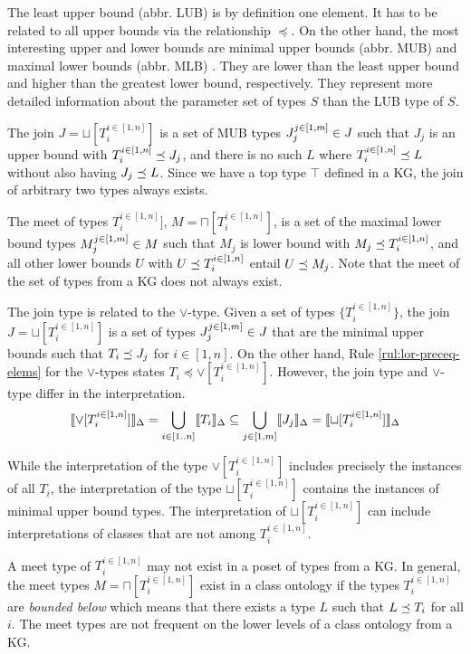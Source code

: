 \documentclass[runningheads]{llncs}
\newcommand{\llb}{\llbracket}
\newcommand{\rrb}{\rrbracket}
\begin{document}
The least upper bound (abbr. LUB) is by definition one element. It has
to be related to all upper bounds via the relationship $\preceq$.  On
the other hand, the most interesting upper and lower bounds are
minimal upper bounds (abbr. MUB) and maximal lower bounds (abbr. MLB)
\cite{Knudstorp2024}. They are lower than the least upper bound and
higher than the greatest lower bound, respectively. They represent
more detailed information about the parameter set of types $S$ than
the LUB type of $S$.

The join $J=\sqcup[T_i^{i\in[1,n]}]$ is a set of MUB types
$J_j^{j\in[1,m]}\in\/J$ such that $J_j$ is an upper bound with
$T_i^{i\in[1,n]}\preceq\/J_j$, and there is no such $L$ where
$T_i^{i\in[1,n]}\preceq\/L$ without also having $J_j\preceq\/L$. Since
we have a top type $\top$ defined in a KG, the join of arbitrary two
types always exists.

The meet of types $T_i^{i\in[1,n]}]$, $M=\sqcap[T_i^{i\in[1,n]}]$, is
a set of the maximal lower bound types $M_j^{j\in[1,m]}\in\/M$ such
that $M_j$ is lower bound with $M_j\preceq\/T_i^{i\in[1,n]}$, and all
other lower bounds $U$ with $U\preceq\/T_i^{i\in[1,n]}$ entail
$U\preceq\/M_j$. Note that the meet of the set of types from a KG does
not always exist.

The join type is related to the $\lor$-type. Given a set of types
$\{T_i^{i\in[1,n]}\}$, the join $J=\sqcup[T_i^{i\in[1,n]}]$ is a set
of types $J_j^{j\in[1,m]}\in\/J$ that are the minimal upper bounds
such that $T_i\preceq\/J_j$ for $i\in[1,n]$. On the other hand,
Rule \ref{rul:lor-preceq-elems} for the $\lor$-types states
$T_i\preceq\lor[T_i^{i\in[1,n]}]$. However, the join type and
$\lor$-type differ in the interpretation.
$$\llb\lor[T_i^{i\in[1,n]}]\rrb_\D=\bigcup_{i\in[1..n]}\llb\/T_i\rrb_\D\subseteq\bigcup_{j\in[1,m]}\llb\/J_j\rrb_\D=\llb\sqcup[T_i^{i\in[1,n]}]\rrb_\D$$

While the interpretation of the type $\lor[T_i^{i\in[1,n]}]$ includes
precisely the instances of all $T_i$, the interpretation of the type
$\sqcup[T_i^{i\in[1,n]}]$ contains the instances of minimal upper bound
types. The interpretation of $\sqcup[T_i^{i\in[1,n]}]$ can include
interpretations of classes that are not among $T_i^{i\in[1,n]}$.

A meet type of $T_i^{i\in[1,n]}$ may not exist in a poset of types
from a KG. In general, the meet types $M=\sqcap[T_i^{i\in[1,n]}]$
exist in a class ontology if the types $T_i^{i\in[1,n]}$ are
\emph{bounded below} \cite{Pierce2002} which means that there exists a
type $L$ such that $L\preceq\/T_i$ for all $i$. The meet types are not
frequent on the lower levels of a class ontology from a KG.
\end{document}
